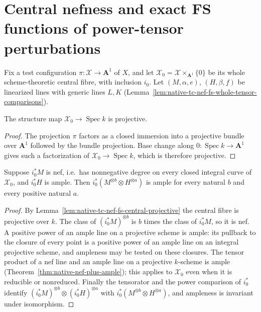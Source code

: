 \section{Central nefness and exact FS functions of power-tensor perturbations}
\label{sec:native-tc-nef-fs-tensor-lines}

Fix a test configuration $\pi\colon\mathcal X\to\mathbf A^1$ of $X$, and let
$\mathcal X_0=\mathcal X\times_{\mathbf A^1}\{0\}$ be its whole scheme-theoretic central
fibre, with inclusion $i_0$.  Let $(M,\alpha,e)$, $(H,\beta,f)$ be linearized lines with
generic lines $L,K$ (Lemma~\ref{lem:native-tc-nef-fs-whole-tensor-comparisons}).

\begin{lemma}
\label{lem:native-tc-nef-fs-central-projective}
\leanok
{}
The structure map $\mathcal X_0\to\operatorname{Spec}k$ is projective.
\end{lemma}

\begin{proof}
The projection $\pi$ factors as a closed immersion into a projective bundle over
$\mathbf A^1$ followed by the bundle projection.  Base change along
$0\colon\operatorname{Spec}k\to\mathbf A^1$ gives such a factorization of
$\mathcal X_0\to\operatorname{Spec}k$, which is therefore projective.
\end{proof}

\begin{theorem}
\label{thm:native-tc-nef-fs-central-tensor-ample}
\leanok
{}
Suppose $i_0^*M$ is nef, i.e.\ has nonnegative degree on every closed integral curve of
$\mathcal X_0$, and $i_0^*H$ is ample.  Then
$i_0^*(M^{\otimes b}\otimes H^{\otimes a})$ is ample for every natural $b$ and every
positive natural $a$.
\end{theorem}

\begin{proof}
By Lemma~\ref{lem:native-tc-nef-fs-central-projective} the central fibre is projective over
$k$.  The class of $(i_0^*M)^{\otimes b}$ is $b$ times the class of $i_0^*M$, so it is
nef.  A positive power of an ample line on a projective scheme is ample: its pullback to
the closure of every point is a positive power of an ample line on an integral projective
scheme, and ampleness may be tested on these closures.  The tensor product of a nef line
and an ample line on a projective $k$-scheme is ample (Theorem~\ref{thm:native-nef-plus-ample});
this applies to $\mathcal X_0$ even when it is reducible or nonreduced.  Finally the
tensorator and the power comparison of $i_0^*$ identify
$(i_0^*M)^{\otimes b}\otimes(i_0^*H)^{\otimes a}$ with
$i_0^*(M^{\otimes b}\otimes H^{\otimes a})$, and ampleness is invariant under
isomorphism.
\end{proof}

